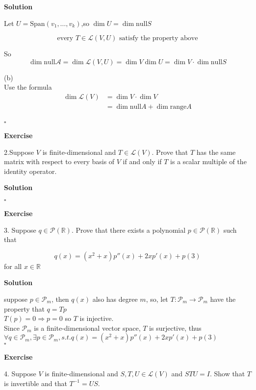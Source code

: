 \documentclass{article}
\newenvironment{exercise}{%
{\textbf{Exercise\\}
    }
}{
}
\newenvironment{solution}{%
{
    \textbf{Solution\\}
    }
}{
  \hfill $\square$ 
  \par\bigskip 
}
\newcommand{\RR}{\mathbb{R}}
\newcommand{\spans}{\text{Span}}
\newcommand{\range}{\text{range}}
\newcommand{\n}{\text{null}}
\begin{document}
\begin{CJK}{UTF8}{gkai}
\begin{solution}
Let $U = \spans(v_1,\ldots,v_k)$,so $\dim U = \dim \n S$

\[\text{every~}T \in \mathcal{L}(V,U)\text{~satisfy the property above}\]

So \[\dim \n \mathcal{A} = \dim \mathcal{L}(V,U) = \dim V \dim U = \dim V \cdot \dim \n S\]

(b)\\

Use the formula
\[\begin{aligned}
    \dim \mathcal{L}(V) &= \dim V \cdot \dim V \\
    &= \dim \n A + \dim \range A\\ 
\end{aligned}\]
\end{solution}

\begin{exercise}
2.Suppose $V$ is finite-dimensional and $T \in \mathcal{L}(V)$. Prove that $T$ has the same matrix with respect to every basis of $V$ if and only if $T$ is a scalar multiple of the identity operator.\\
\end{exercise}

\begin{solution}

\end{solution}

\begin{exercise}
3. Suppose $q \in \mathcal{P}(\RR)$. Prove that there exists a polynomial $p \in \mathcal{P}(\RR)$ such
that

\[q(x) = (x^2 +x)p''(x) + 2xp'(x) + p(3)\]
for all $x \in \RR$\\
\end{exercise}

\begin{solution}
suppose $p\in \mathcal{P}_m$, then $q(x)$ also has degree $m$, so, let $T : \mathcal{P}_m\to \mathcal{P}_m$ have the property that $q = T p$\\

$T(p) = 0 \Rightarrow p = 0$ so $T$ is injective.\\

Since $\mathcal{P}_m$ is a finite-dimensional vector space, $T$ is surjective, thus $\forall q\in \mathcal{P}_m, \exists p \in \mathcal{P}_m , s.t. q(x) = (x^2 +x)p''(x) + 2xp'(x) + p(3)$ \\
\end{solution}

\begin{exercise}
    4. Suppose $V$ is finite-dimensional and $S,T,U \in \mathcal{L}(V)$ and $STU = I$. Show that $T$ is invertible and that $T^{-1} = US$.\\


\end{exercise}
\end{CJK}
\end{document}
